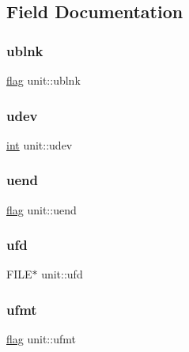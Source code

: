 \subsection{Field Documentation}
\mbox{\label{structunit_ab16de04289da2318bcc3fdf269914765}} 
\subsubsection{\texorpdfstring{ublnk}{ublnk}}
{\footnotesize\ttfamily \hyperlink{dependencies_2third-party_2clapack_23_82_81_2_f2_c_l_i_b_s_2libf2c_2f2c_8h_abf5d144da384425ae6cb542ce6eec8d3}{flag} unit\+::ublnk}

\mbox{\label{structunit_a8c7e97b7621cbeaaf9736ec2f89f79c0}} 
\subsubsection{\texorpdfstring{udev}{udev}}
{\footnotesize\ttfamily \hyperlink{lp__lib_8h_adeb9ec6400320e4923ac9d836d509ddb}{int} unit\+::udev}

\mbox{\label{structunit_a49bb8731183f9787d130b6eb319d9503}} 
\subsubsection{\texorpdfstring{uend}{uend}}
{\footnotesize\ttfamily \hyperlink{dependencies_2third-party_2clapack_23_82_81_2_f2_c_l_i_b_s_2libf2c_2f2c_8h_abf5d144da384425ae6cb542ce6eec8d3}{flag} unit\+::uend}

\mbox{\label{structunit_acf3c844baecd12fa90768de0fa495913}} 
\subsubsection{\texorpdfstring{ufd}{ufd}}
{\footnotesize\ttfamily F\+I\+LE$\ast$ unit\+::ufd}

\mbox{\label{structunit_a4f5378dc3f43a2b8dcaab697fdf5cfae}} 
\subsubsection{\texorpdfstring{ufmt}{ufmt}}
{\footnotesize\ttfamily \hyperlink{dependencies_2third-party_2clapack_23_82_81_2_f2_c_l_i_b_s_2libf2c_2f2c_8h_abf5d144da384425ae6cb542ce6eec8d3}{flag} unit\+::ufmt}

